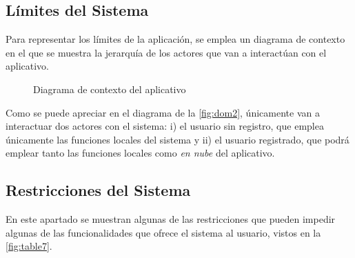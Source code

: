   \subsection{Límites del Sistema}
  Para representar los límites de la aplicación, se emplea un diagrama de contexto en el que se muestra la jerarquía de los actores 
  que van a interactúan con el aplicativo.

\begin{figure}[H]
  \centering
{}
  \caption{Diagrama de contexto del aplicativo}
   \label{fig:dom2}
\end{figure}

Como se puede apreciar en el diagrama de la \autoref{fig:dom2}, únicamente van a interactuar dos actores con el sistema: i) el usuario sin registro,
que emplea únicamente las funciones locales del sistema y ii) el usuario registrado, que podrá emplear tanto las funciones locales como
\textit{en nube} del aplicativo.

\subsection{Restricciones del Sistema}

En este apartado se muestran algunas de las restricciones que pueden impedir algunas de las funcionalidades que ofrece el sistema
al usuario, vistos en la \autoref{fig:table7}.

